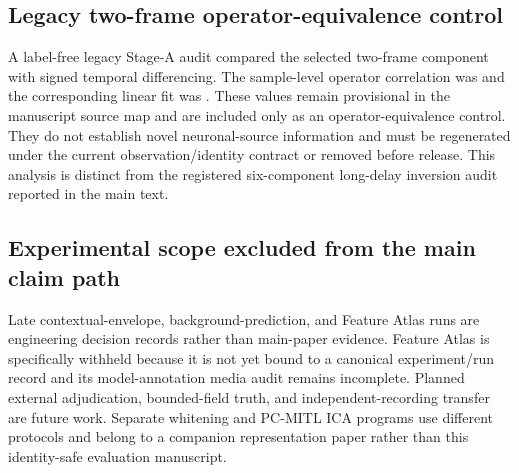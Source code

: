 \subsection{Legacy two-frame operator-equivalence control}

A label-free legacy Stage-A audit compared the selected two-frame component with
signed temporal differencing. The sample-level operator correlation was
 and the corresponding linear
fit was . These values remain
provisional in the manuscript source map and are included only as an
operator-equivalence control. They do not establish novel neuronal-source
information and must be regenerated under the current observation/identity
contract or removed before release. This analysis is distinct from the
registered six-component long-delay inversion audit reported in the main text.

\subsection{Experimental scope excluded from the main claim path}

Late contextual-envelope, background-prediction, and Feature Atlas runs are
engineering decision records rather than main-paper evidence. Feature Atlas is
specifically withheld because it is not yet bound to a canonical experiment/run
record and its model-annotation media audit remains incomplete. Planned external
adjudication, bounded-field truth, and independent-recording transfer are future
work. Separate whitening and PC-MITL ICA programs use different protocols and
belong to a companion representation paper rather than this identity-safe
evaluation manuscript.
